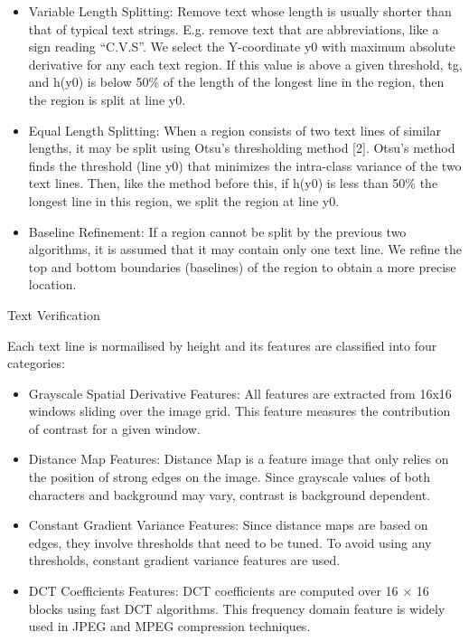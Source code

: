 \documentclass[a4paper,12pt]{article}
\begin{document}
\begin{itemize}
\item
Variable Length Splitting: Remove text whose length is usually shorter than that of typical text strings. E.g. remove text that are abbreviations, like a sign reading “C.V.S”. We select the Y-coordinate y0 with maximum absolute derivative for any each text region. If this value is above a given threshold, tg, and h(y0) is below 50\% of the length of the longest line in the region, then the region is split at line y0.

\item
Equal Length Splitting: When a region consists of two text lines of similar lengths, it may be split using Otsu’s thresholding method [2]. Otsu’s method finds the threshold (line y0) that minimizes the intra-class variance of the two text lines. Then, like the method before this, if h(y0) is less than 50\% the longest line in this region, we split the region at line y0.

\item
Baseline Refinement: If a region cannot be split by the previous two algorithms, it is assumed that it may contain only one text line. We refine the top and bottom boundaries (baselines) of the region to obtain a more precise location.
\end{itemize}


Text Verification

Each text line is normailised by height and its features are classified into four categories:

\begin{itemize}
\item
Grayscale Spatial Derivative Features: All features are extracted from 16x16 windows sliding over the image grid. This feature measures the contribution of contrast for a given window.
\item
Distance Map Features: Distance Map is a feature image that only relies on the position of strong edges on the image. Since grayscale values of both characters and background may vary, contrast is background dependent.
\item
Constant Gradient Variance Features: Since distance maps are based on edges, they involve thresholds that need to be tuned. To avoid using any thresholds, constant gradient variance features are used.
\item
DCT Coefficients Features: DCT coefficients are computed over 16 × 16 blocks using fast DCT algorithms. This frequency domain feature is widely used in JPEG and MPEG compression techniques.
\end{itemize}
\end{document}
